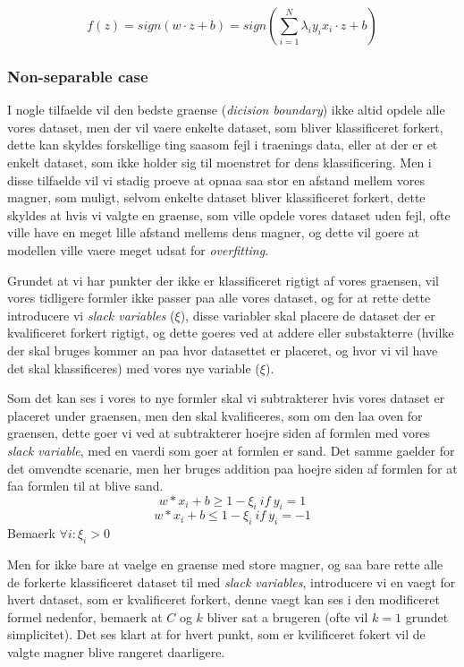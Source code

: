 \documentclass{article}
\begin{document}
$$f(z) = sign(w \cdot z + b) = sign( \sum\limits_{i=1}^N \lambda_i y_i x_i \cdot z + b)$$

\subsubsection{Non-separable case}
I nogle tilfaelde vil den bedste graense (\textit{dicision boundary}) ikke altid opdele alle vores dataset, men der vil vaere enkelte dataset, som bliver klassificeret forkert, dette kan skyldes forskellige ting saasom fejl i traenings data, eller at der er et enkelt dataset, som ikke holder sig til moenstret for dens klassificering. Men i disse tilfaelde vil vi stadig proeve at opnaa saa stor en afstand mellem vores magner, som muligt, selvom enkelte dataset bliver klassificeret forkert, dette skyldes at hvis vi valgte en graense, som ville opdele vores dataset uden fejl, ofte ville have en meget lille afstand mellems dens magner, og dette vil goere at modellen ville vaere meget udsat for \textit{overfitting}. 

Grundet at vi har punkter der ikke er klassificeret rigtigt af vores graensen, vil vores tidligere formler ikke passer paa alle vores dataset, og for at rette dette introducere vi \textit{slack variables} ($\xi$), disse variabler skal placere de dataset der er kvalificeret forkert rigtigt, og dette goeres ved at addere eller substakterre (hvilke der skal bruges kommer an paa hvor datasettet er placeret, og hvor vi vil have det skal klassificeres) med vores nye variable ($\xi$). 

 Som det kan ses i vores to nye formler skal vi subtrakterer hvis vores dataset er placeret under graensen, men den skal kvalificeres, som om den laa oven for graensen, dette goer vi ved at subtrakterer hoejre siden af formlen med vores \textit{slack variable}, med en vaerdi som goer at formlen er sand. Det samme gaelder for det omvendte scenarie, men her bruges addition paa hoejre siden af formlen for at faa formlen til at blive sand.  
$$w * x_i + b \geq 1 - \xi_i \ if \ y_i = 1$$
$$w * x_i + b \leq 1 - \xi_i \ if \ y_i = -1$$
Bemaerk $\forall i : \xi_i > 0$

Men for ikke bare at vaelge en graense med store magner, og saa bare rette alle de forkerte klassificeret dataset til med \textit{slack variables}, introducere vi en vaegt for hvert dataset, som er kvalificeret forkert, denne vaegt kan ses i den modificeret formel nedenfor, bemaerk at $C$ og $k$ bliver sat a brugeren (ofte vil $k = 1$ grundet simplicitet). Det ses klart at for hvert punkt, som er kvilificeret fokert vil de valgte magner blive rangeret daarligere. 
\end{document}

